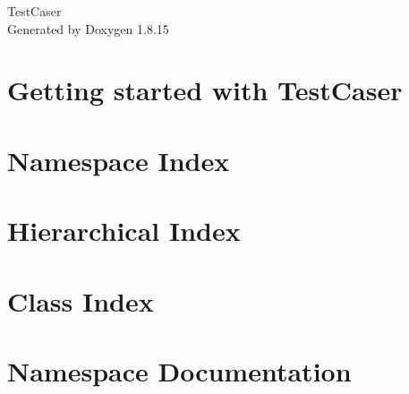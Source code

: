 \documentclass[twoside]{book}
\newcommand{\+}{\discretionary{\mbox{\scriptsize$\hookleftarrow$}}{}{}}
\newcommand{\clearemptydoublepage}{%
  \newpage{\pagestyle{empty}\cleardoublepage}%
}
\begin{document}
\hypersetup{pageanchor=false,
             bookmarksnumbered=true,
             pdfencoding=unicode
            }
\begin{titlepage}
\vspace*{7cm}
\begin{center}%
{\Large Test\+Caser }\\
\vspace*{1cm}
{\large Generated by Doxygen 1.8.15}\\
\end{center}
\end{titlepage}
\clearemptydoublepage
{}
\tableofcontents
\clearemptydoublepage
{}
\hypersetup{pageanchor=true}

\chapter{Getting started with Test\+Caser}
\label{index}\hypertarget{index}{}
\chapter{Namespace Index}

\chapter{Hierarchical Index}

\chapter{Class Index}

\chapter{Namespace Documentation}







\end{document}
